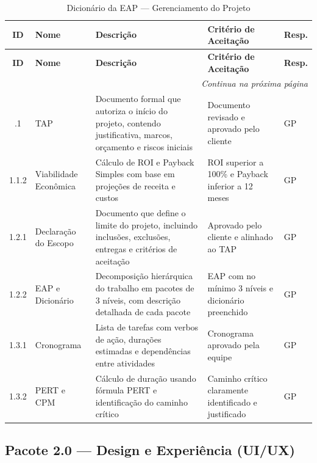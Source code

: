 \documentclass[12pt,a4paper,oneside]{report}
\begin{document}
\begin{longtable}{c p{2.5cm} p{3.5cm} p{3.5cm} p{2cm}}
\caption{Dicionário da EAP --- Gerenciamento do Projeto} \\
\toprule
\textbf{ID} & \textbf{Nome} & \textbf{Descrição} & \textbf{Critério de Aceitação} & \textbf{Resp.} \\
\midrule
\endfirsthead
\toprule
\textbf{ID} & \textbf{Nome} & \textbf{Descrição} & \textbf{Critério de Aceitação} & \textbf{Resp.} \\
\midrule
\endhead
\midrule
\multicolumn{5}{r}{\textit{Continua na próxima página}} \\
\endfoot
\bottomrule
\endlastfoot
1.1.1 & TAP & Documento formal que autoriza o início do projeto, contendo justificativa, marcos, orçamento e riscos iniciais & Documento revisado e aprovado pelo cliente & GP \\
1.1.2 & Viabilidade Econômica & Cálculo de ROI e Payback Simples com base em projeções de receita e custos & ROI superior a 100\% e Payback inferior a 12 meses & GP \\
1.2.1 & Declaração do Escopo & Documento que define o limite do projeto, incluindo inclusões, exclusões, entregas e critérios de aceitação & Aprovado pelo cliente e alinhado ao TAP & GP \\
1.2.2 & EAP e Dicionário & Decomposição hierárquica do trabalho em pacotes de 3 níveis, com descrição detalhada de cada pacote & EAP com no mínimo 3 níveis e dicionário preenchido & GP \\
1.3.1 & Cronograma & Lista de tarefas com verbos de ação, durações estimadas e dependências entre atividades & Cronograma aprovado pela equipe & GP \\
1.3.2 & PERT e CPM & Cálculo de duração usando fórmula PERT e identificação do caminho crítico & Caminho crítico claramente identificado e justificado & GP \\
\end{longtable}

\subsection{Pacote 2.0 --- Design e Experiência (UI/UX)}
\end{document}
